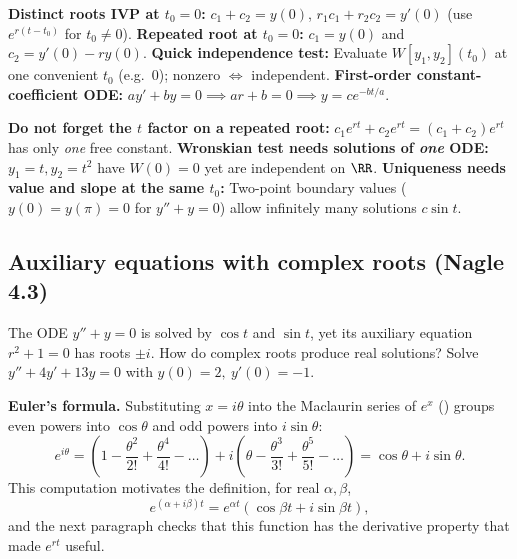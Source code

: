 \documentclass[10pt]{scrartcl}
\begin{document}
\begin{shortcuts}
  \ii \textbf{Distinct roots IVP at $t_0=0$:} $c_1+c_2=y(0)$, $r_1c_1+r_2c_2=y'(0)$ (use $e^{r(t-t_0)}$ for $t_0\neq 0$).
  \ii \textbf{Repeated root at $t_0=0$:} $c_1=y(0)$ and $c_2=y'(0)-ry(0)$.
  \ii \textbf{Quick independence test:} Evaluate $W[y_1,y_2](t_0)$ at one convenient $t_0$ (e.g.\ $0$); nonzero $\iff$ independent.
  \ii \textbf{First-order constant-coefficient ODE:} $ay'+by=0\implies ar+b=0\implies y=ce^{-bt/a}$.
\end{shortcuts}

\begin{trapbox}
  \ii \textbf{Do not forget the $t$ factor on a repeated root:} $c_1e^{rt}+c_2e^{rt}=(c_1+c_2)e^{rt}$ has only \emph{one} free constant.
  \ii \textbf{Wronskian test needs solutions of \emph{one} ODE:} $y_1=t, y_2=t^2$ have $W(0)=0$ yet are independent on $\RR$.
  \ii \textbf{Uniqueness needs value and slope at the same $t_0$:} Two-point boundary values ($y(0)=y(\pi)=0$ for $y''+y=0$) allow infinitely many solutions $c\sin t$.
\end{trapbox}

\subsection{Auxiliary equations with complex roots (Nagle 4.3)}
\begin{qbox}
  The ODE $y''+y=0$ is solved by $\cos t$ and $\sin t$, yet its auxiliary equation $r^2+1=0$ has roots $\pm i$. How do complex roots produce real solutions? Solve $y''+4y'+13y=0$ with $y(0)=2,\ y'(0)=-1$.
\end{qbox}

\noindent\textbf{Euler's formula.} Substituting $x=i\theta$ into the Maclaurin series of $e^x$ () groups even powers into $\cos\theta$ and odd powers into $i\sin\theta$:
\[
  e^{i\theta} = \left(1-\frac{\theta^2}{2!}+\frac{\theta^4}{4!}-\dots\right) + i\left(\theta-\frac{\theta^3}{3!}+\frac{\theta^5}{5!}-\dots\right) = \cos\theta+i\sin\theta.
\]
This computation motivates the definition, for real $\alpha,\beta$,
\[
  e^{(\alpha+i\beta)t}=e^{\alpha t}(\cos\beta t+i\sin\beta t),
\]
and the next paragraph checks that this function has the derivative property that made $e^{rt}$ useful.
\end{document}
